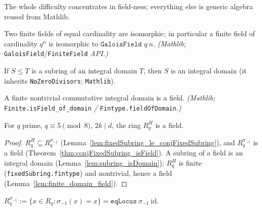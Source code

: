 The whole difficulty concentrates in field-ness; everything else is generic algebra reused from
Mathlib.

\begin{lemma}\label{lem:finiteField_ringEquiv_of_card}
Two finite fields of equal cardinality are isomorphic; in particular a finite field of
cardinality $q^{n}$ is isomorphic to $\texttt{GaloisField } q\ n$. \emph{(Mathlib;}
\texttt{GaloisField}/\texttt{FiniteField} \emph{API.)}
\end{lemma}

\begin{lemma}\label{lem:subring_isDomain}
If $S \le T$ is a subring of an integral domain $T$, then $S$ is an integral domain
(it inherits \texttt{NoZeroDivisors}; \texttt{Mathlib}).
\end{lemma}

\begin{lemma}\label{lem:finite_domain_field}
A finite nontrivial commutative integral domain is a field. \emph{(Mathlib;}
\texttt{Finite.isField\_of\_domain} \emph{/} \texttt{Fintype.fieldOfDomain}.\emph{)}
\end{lemma}

\begin{theorem}[$R_q^H$ is a field]\label{thm:fixedSubring_isField}
\leanok
{}
For $q$ prime, $q \equiv 5 \pmod 8$, $2k \mid d$, the ring $R_q^H$ is a field.
\end{theorem}

\begin{proof}
$R_q^H \subseteq R_q^{\sigma_{-1}}$ (Lemma~\ref{lem:fixedSubring_le_conjFixedSubring}), and
$R_q^{\sigma_{-1}}$ is a field (Theorem~\ref{thm:conjFixedSubring_isField}). A subring of a field
is an integral domain (Lemma~\ref{lem:subring_isDomain}); $R_q^H$ is finite
(\texttt{fixedSubring.fintype}) and nontrivial, hence a field
(Lemma~\ref{lem:finite_domain_field}).
\end{proof}

\begin{definition}\label{def:conjFixedSubring}
\leanok
$R_q^{\sigma_{-1}} := \{x \in R_q : \sigma_{-1}(x) = x\} = \texttt{eqLocus}\ \sigma_{-1}\ \mathrm{id}$.
\end{definition}

